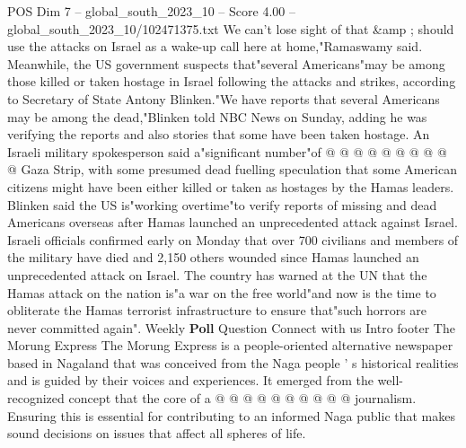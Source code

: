 \begin{textsample}{POS Dim 7 – global\_south\_2023\_10 – Score 4.00 – global\_south\_2023\_10/102471375.txt}
We can't lose sight of that \&amp ; should use the attacks on Israel as a wake-up call here at home,"Ramaswamy said.
Meanwhile, the US government suspects that"several Americans"may be among those killed or taken hostage in Israel following the attacks and strikes, according to Secretary of State Antony Blinken."We have reports that several Americans may be among the dead,"Blinken told NBC News on Sunday, adding he was verifying the reports and also stories that some have been taken hostage.
An Israeli military spokesperson said a"significant number"of @ @ @ @ @ @ @ @ @ @ Gaza Strip, with some presumed dead fuelling speculation that some American citizens might have been either killed or taken as hostages by the Hamas leaders.
Blinken said the US is"working overtime"to verify reports of missing and dead Americans overseas after Hamas launched an unprecedented attack against Israel.
Israeli officials confirmed early on Monday that over 700 civilians and members of the military have died and 2,150 others wounded since Hamas launched an unprecedented attack on Israel.
The country has warned at the UN that the Hamas attack on the nation is"a war on the free world"and now is the time to obliterate the Hamas terrorist infrastructure to ensure that"such horrors are never committed again".
Weekly \textbf{Poll} Question Connect with us Intro footer The Morung Express The Morung Express is a people-oriented alternative newspaper based in Nagaland that was conceived from the Naga people ' s historical realities and is guided by their voices and experiences.
It emerged from the well-recognized concept that the core of a @ @ @ @ @ @ @ @ @ @ journalism.
Ensuring this is essential for contributing to an informed Naga public that makes sound decisions on issues that affect all spheres of life.

\end{textsample}

